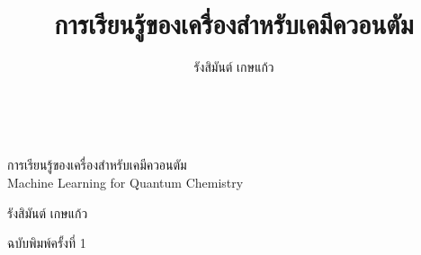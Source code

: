



\let\cleardoublepage\clearpage

\title{การเรียนรู้ของเครื่องสำหรับเคมีควอนตัม}
\author{รังสิมันต์ เกษแก้ว}





\newpage
\ %
\newpage

\frontmatter

\thispagestyle{empty}

\begin{flushright}
\vspace*{2.0in}

\begin{spacing}{3}
{\Huge การเรียนรู้ของเครื่องสำหรับเคมีควอนตัม}\\
{\LARGE Machine Learning for Quantum Chemistry}
\end{spacing}

\vspace{0.25in}

{\Large รังสิมันต์ เกษแก้ว}

\vspace{1in}

{ฉบับพิมพ์ครั้งที่ 1}
\vspace{0.5in}

\vfill

\end{flushright}






\pagestyle{empty} %
\tableofcontents

